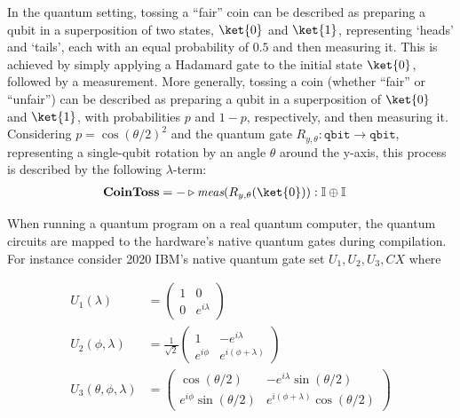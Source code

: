 \begin{example} 
  In the quantum setting, tossing a ``fair'' coin can be described as preparing a qubit in a superposition of two states, $\ket{0}$ and $\ket{1}$, representing `heads' and `tails', each with an equal probability of $0.5$ and then measuring it. This is achieved by simply applying a Hadamard gate to the initial state $\ket{0}$, followed by a measurement.
More generally, tossing a coin (whether ``fair'' or ``unfair'') can be described as preparing a qubit in a superposition of  $\ket{0}$ and $\ket{1}$, with probabilities $p$ and $1-p$, respectively,  and then measuring it.  Considering $p= \cos(\theta/2)^2$ and the quantum gate $R_{y,\theta} : \mathtt{qbit} \to \mathtt{qbit}$, representing a single-qubit rotation by an angle \( \theta \) around the y-axis,  this process is described by the following $\lambda$-term:
\begin{align*}
  &\textbf{CoinToss} = - \vljud \emph{meas} (R_{y,\theta} (\ket{0})): \typeI \oplus \typeI
\end{align*}

When running a quantum program on a real quantum computer, the quantum circuits are mapped to the hardware's native quantum gates during compilation. For instance consider 2020 IBM's native quantum gate set $U_1,U_2,U_3,CX$ \cite{December2020Product} where

  \begin{align*}
    U_1(\lambda) &= 
    \begin{pmatrix}
        1 & 0 \\
        0 & e^{i\lambda}
    \end{pmatrix} \\
    U_2(\phi, \lambda) &= 
    \frac{1}{\sqrt{2}}
    \begin{pmatrix}
        1 & -e^{i\lambda} \\
        e^{i\phi} & e^{i(\phi+\lambda)}
    \end{pmatrix} \\
    U_3(\theta, \phi, \lambda) &= 
    \begin{pmatrix}
        \cos(\theta/2) & -e^{i\lambda}\sin(\theta/2) \\
        e^{i\phi}\sin(\theta/2) & e^{i(\phi+\lambda)}\cos(\theta/2)
    \end{pmatrix} \\
\end{align*}


\end{example}
